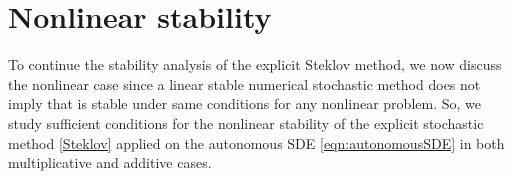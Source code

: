   
   


  
  \section{Nonlinear stability} \label{sec5}
      To continue the stability analysis of the explicit Steklov method,  we now discuss
    the nonlinear case since a linear stable numerical stochastic method  does  not imply
    that is stable  under same conditions for any nonlinear problem. So, we study
    sufficient conditions for the nonlinear stability of the explicit stochastic method
    \eqref{Steklov} applied on the  autonomous SDE \eqref{eqn:autonomousSDE} in both
    multiplicative and additive cases.
